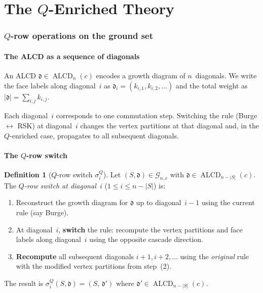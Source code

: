 \documentclass[11pt]{article}
\newcommand{\ALCD}{\operatorname{ALCD}}
\theoremstyle{plain}
\theoremstyle{definition}
\newtheorem{definition}[theorem]{Definition}
\begin{document}
\part{The $Q$-Enriched Theory}


\section{$Q$-row operations on the ground set}
\label{sec:Q-row}

\subsection{The ALCD as a sequence of diagonals}

An ALCD $\mathfrak{d} \in \ALCD_n(c)$ encodes a growth
diagram of $n$~diagonals.  We write the face labels along
diagonal~$i$ as $\mathfrak{d}_i = (k_{i,1}, k_{i,2}, \ldots)$
and the total weight as
$|\mathfrak{d}| = \sum_{i,j} k_{i,j}$.

Each diagonal~$i$ corresponds to one commutation step.
Switching the rule (Burge $\leftrightarrow$ RSK) at
diagonal~$i$ changes the vertex partitions at that diagonal
and, in the $Q$-enriched case, propagates to all subsequent
diagonals.


\subsection{The $Q$-row switch}

\begin{definition}[$Q$-row switch $\sigma_i^Q$]
\label{def:Q-row-switch}
Let $(S, \mathfrak{d}) \in \mathcal{G}_{n,c}$ with
$\mathfrak{d} \in \ALCD_{n-|S|}(c)$.  The
\emph{$Q$-row switch at diagonal~$i$}
($1 \leq i \leq n - |S|$) is:
\begin{enumerate}
  \item Reconstruct the growth diagram for $\mathfrak{d}$ up
    to diagonal~$i-1$ using the current rule (say Burge).
  \item At diagonal~$i$, \textbf{switch} the rule: recompute
    the vertex partitions and face labels along diagonal~$i$
    using the opposite cascade direction.
  \item \textbf{Recompute} all subsequent diagonals
    $i+1, i+2, \ldots$ using the \emph{original} rule with
    the modified vertex partitions from step~(2).
\end{enumerate}
The result is $\sigma_i^Q(S, \mathfrak{d})
= (S,\, \mathfrak{d}')$ where
$\mathfrak{d}' \in \ALCD_{n-|S|}(c)$.
\end{definition}
\end{document}
